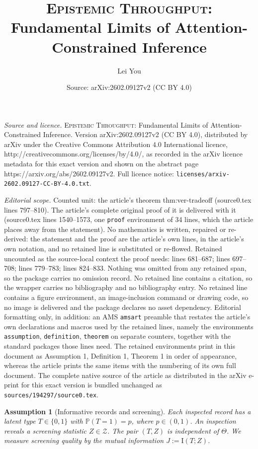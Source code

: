 \documentclass[10pt,a4paper]{amsart}
\title{\textsc{Epistemic Throughput}: Fundamental Limits of Attention-Constrained Inference}
\author{Lei You}
\date{Source: arXiv:2602.09127v2 (CC BY 4.0)}
\newtheorem{assumption}{Assumption}
\newcommand{\I}{\mathrm{I}}
\newcommand{\Prob}{\mathbb{P}}
\newcommand{\cZ}{\mathcal{Z}}
\begin{document}
\maketitle

\noindent\emph{Source and licence.} \textsc{Epistemic Throughput}: Fundamental Limits of Attention-Constrained Inference. Version arXiv:2602.09127v2 (CC BY 4.0), distributed by arXiv under the Creative Commons Attribution 4.0 International licence, http://creativecommons.org/licenses/by/4.0/, as recorded in the arXiv licence metadata for this exact version and shown on the abstract page https://arxiv.org/abs/2602.09127v2. Full licence notice: \texttt{licenses/arxiv-2602.09127-CC-BY-4.0.txt}.\par\smallskip

\noindent\textit{Editorial scope.} Counted unit: the article's theorem thm:ver-tradeoff (source0.tex lines 797--810). The article's complete original proof of it is delivered with it (source0.tex lines 1540--1573, one \texttt{proof} environment of 34 lines, which the article places away from the statement). No mathematics is written, repaired or re-derived: the statement and the proof are the article's own lines, in the article's own notation, and no retained line is substituted or re-flowed.  Retained uncounted as the source-local context the proof needs: lines 681--687; lines 697--708; lines 779--783; lines 824--833.  Nothing was omitted from any retained span, so the package carries no omission record.  No retained line contains a citation, so the wrapper carries no bibliography and no bibliography entry.  No retained line contains a figure environment, an image-inclusion command or drawing code, so no image is delivered and the package declares no asset dependency.  Editorial formatting only, in addition: an AMS \texttt{amsart} preamble that restates the article's own declarations and macros used by the retained lines, namely the environments \texttt{assumption}, \texttt{definition}, \texttt{theorem} on separate counters, together with the standard packages those lines need.  The retained environments print in this document as Assumption 1, Definition 1, Theorem 1 in order of appearance, whereas the article prints the same items with the numbering of its own full document.  The complete native source of the article as distributed in the arXiv e-print for this exact version is bundled unchanged as \texttt{sources/194297/source0.tex}.
\begin{assumption}[Informative records and screening]
\label{asmp:screening}
Each inspected record has a latent type $T\in\{0,1\}$ with $\Prob(T=1)=p$, where $p\in(0,1)$.
An inspection reveals a screening statistic $Z\in\cZ$.
The pair $(T,Z)$ is independent of $\Theta$.
We measure screening quality by the mutual information $J:=\I(T;Z)$.
\end{assumption}
\end{document}
